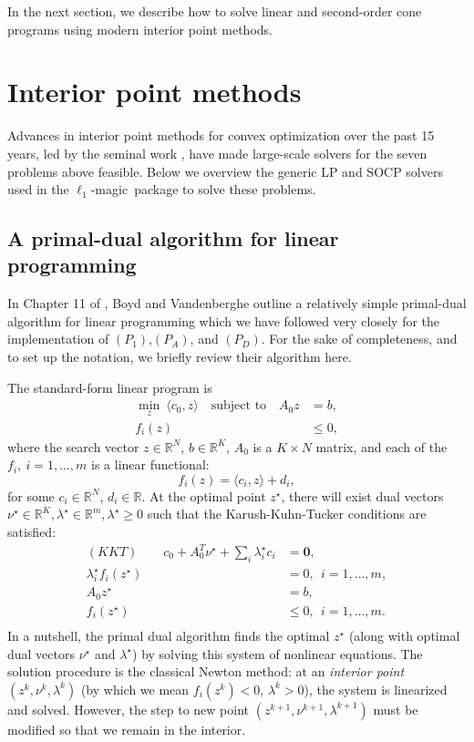 \documentclass{article}
\newcommand{\packname}{{\sc $\ell_1$-magic}\ }
\newcommand{\R}{\mathbb{R}}
\newcommand{\<}{\langle}
\renewcommand{\>}{\rangle}
\begin{document}
In the next section, we describe how to solve linear and second-order cone programs using modern interior point methods.


\section{Interior point methods}

Advances in interior point methods for convex optimization over the past 15 years, led by the seminal work \cite{nesterov94in}, have made large-scale solvers for the seven problems above feasible.  Below we overview the generic LP and SOCP solvers used in the \packname package to solve these problems.  

\subsection{A primal-dual algorithm for linear programming}
\label{sec:primaldual}

In Chapter 11 of \cite{boyd04co}, Boyd and Vandenberghe outline a relatively simple primal-dual
algorithm for linear programming which we have followed very closely for the implementation of 
$(P_1)$,$(P_A)$, and $(P_D)$.  For the sake of completeness, and to set up the notation, we briefly review their algorithm here.

The standard-form linear program is
\begin{align*}
\min_{z}~ \<c_0,z\> \quad\text{subject~to}\quad
 A_0 z & = b, \\[-2mm]
 f_i(z) &\leq 0,
\end{align*}
where the search vector $z\in\R^N$, $b\in\R^K$, $A_0$ is a $K\times N$ matrix, and each of the $f_i,~i=1,\ldots,m$ is a linear functional:
\[
f_i(z) = \<c_i,z\> + d_i,
\]
for some $c_i\in\R^N$, $d_i\in\R$.  At the optimal point $z^\star$, there will exist dual vectors $\nu^\star\in\R^K,\lambda^\star\in\R^m,\lambda^\star\geq 0$ such that the Karush-Kuhn-Tucker conditions are satisfied:
\begin{align*}
(KKT)\quad\quad
c_0 + A_0^T\nu^\star + \sum_i \lambda^\star_i c_i & = \mathbf{0}, \\
\lambda^\star_i f_i(z^\star) & = 0,~~i=1,\ldots,m, \\
A_0 z^\star & = b, \\
f_i(z^\star) & \leq 0, ~~i=1,\ldots,m.\\
\end{align*}
In a nutshell, the primal dual algorithm finds the optimal $z^\star$ (along with optimal dual vectors $\nu^\star$ and $\lambda^\star$) by solving this system of nonlinear equations.   The solution procedure is the classical Newton method: at an {\em interior point} $(z^k, \nu^k, \lambda^k)$ (by which we mean $f_i(z^k) < 0$, $\lambda^k > 0$), the system is linearized and solved.  
However, the step to new point $(z^{k+1}, \nu^{k+1}, \lambda^{k+1})$ must be modified so that we remain in the interior.
\end{document}
